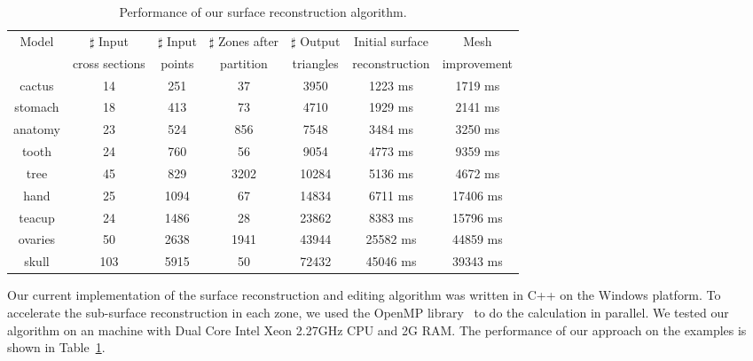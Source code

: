 \begin{table}[htbp]
\caption{Performance of our surface reconstruction
algorithm.}
\begin{center}
\begin{tabular}{|c|c|c|c|c|c|c|}
\hline
  Model    &$\sharp$ Input&$\sharp$ Input&$\sharp$ Zones after&$\sharp$ Output&Initial surface&Mesh\\
                 &cross sections&points&partition&triangles&reconstruction&improvement\\

\hline cactus   &14&251&37&3950&1223 ms&1719 ms\\
\hline stomach  &18&413&73&4710&1929 ms&2141 ms\\
\hline anatomy  &23&524&856&7548&3484 ms&3250 ms\\
\hline tooth    &24&760&56&9054&4773 ms&9359 ms\\
\hline tree     &45&829&3202&10284&5136 ms&4672 ms\\
\hline hand     &25&1094&67&14834&6711 ms&17406 ms\\
\hline teacup   &24&1486&28&23862&8383 ms&15796 ms\\
\hline ovaries  &50&2638&1941&43944&25582 ms&44859 ms\\
\hline skull    &103&5915&50&72432&45046 ms&39343 ms\\
\hline
\end{tabular}
\label{tb:perform} %
\end{center}
\end{table}

Our current implementation of the surface reconstruction and editing
algorithm was  written in C++ on the Windows platform. To accelerate
the sub-surface reconstruction in each zone, we used the OpenMP
library~\cite{openmp08} to do the calculation in parallel. We tested
our algorithm on an machine with Dual Core Intel Xeon 2.27GHz CPU
and 2G RAM. The performance of our approach on the examples is shown
in Table~\ref{tb:perform}.




